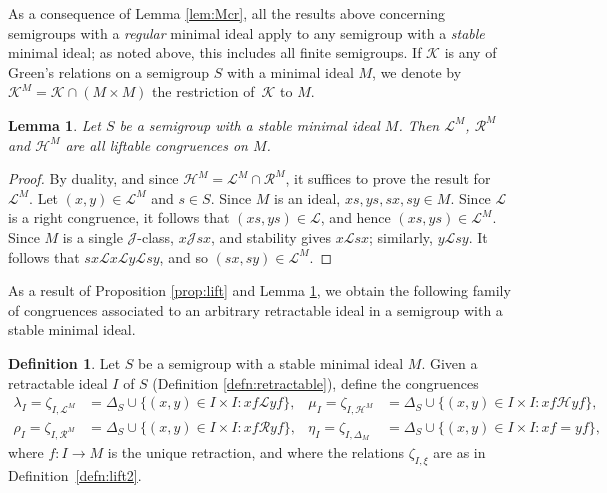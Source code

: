 \documentclass[11pt,a4paper]{article}
\renewcommand{\H}{\mathrel{\mathscr H}}
\renewcommand{\L}{\mathrel{\mathscr L}}
\newcommand{\R}{\mathrel{\mathscr R}}
\newcommand{\gJ}{\mathrel{\mathscr J}}
\newcommand{\K}{\mathrel{\mathscr K}}
\newcommand{\De}{\Delta}
\newcommand{\set}[2]{\{ {#1} : {#2} \}}
\newcommand{\1}{\id_n}
\newcommand{\la}{\langle}
\newcommand{\ra}{\rangle}
\newcommand{\pf}{\begin{proof}}
\newcommand{\epf}{\end{proof}}
\numberwithin{equation}{section}
\newtheorem{lemma}[equation]{Lemma}
\theoremstyle{definition}
\newtheorem{rem}[equation]{Remark}
\newtheorem{defn}[equation]{Definition}
\begin{document}
As a consequence of Lemma \ref{lem:Mcr}, all the results above concerning semigroups with a \emph{regular} minimal ideal apply to any semigroup with a \emph{stable} minimal ideal; as noted above, this includes all finite semigroups.
%
If $\K$ is any of Green's relations on a semigroup $S$ with a minimal ideal $M$, we denote by ${\K^M}={\K}\cap(M\times M)$ the restriction of~$\K$ to $M$.

\begin{lemma}\label{lem:lift}
Let $S$ be a semigroup with a stable minimal ideal $M$.  Then $\L^M$, $\R^M$ and $\H^M$ are all liftable congruences on $M$.
\end{lemma}

\pf By duality, and since ${\H^M}={\L^M}\cap{\R^M}$, it suffices to prove the
result for $\L^M$.  Let $(x,y)\in{\L^M}$ and $s\in S$.  Since $M$ is an ideal,
$xs,ys,sx,sy\in M$.  Since $\L$ is a right congruence, it follows that
$(xs,ys)\in{\L}$, and hence $(xs,ys)\in{\L^M}$.  Since $M$ is a single
$\gJ$-class, $x\gJ sx$, and stability gives $x\L sx$; similarly, $y\L sy$.  It
follows that $sx\L x\L y\L sy$, and so $(sx,sy)\in{\L^M}$. \epf


As a result of Proposition \ref{prop:lift} and Lemma \ref{lem:lift}, we obtain
the following family of congruences associated to an arbitrary retractable
ideal in a semigroup with a stable minimal ideal.

\begin{defn}
\label{defn:lrmI}
Let $S$ be a semigroup with a stable minimal ideal $M$.  Given a retractable ideal $I$ of $S$ (Definition \ref{defn:retractable}), define the congruences
\begin{align*}
\lambda_I=\zeta_{I,{\L^M}}&=\Delta_S\cup\set{ (x,y)\in I\times I}{ xf\L yf},
  &\mu_I=\zeta_{I,{\H^M}}&=\Delta_S\cup\set{ (x,y)\in I\times I}{ xf\H yf},\\
%
\rho_I=\zeta_{I,{\R^M}}&=\Delta_S\cup\set{ (x,y)\in I\times I}{ xf\R yf},
  &\eta_I=\zeta_{I,\De_M}&=\Delta_S\cup\set{ (x,y)\in I\times I}{ xf= yf},
\end{align*}
where $f:I\to M$ is the unique retraction, and where the relations $\zeta_{I,\xi}$ are as in Definition~\ref{defn:lift2}.
\end{defn}
\end{document}
